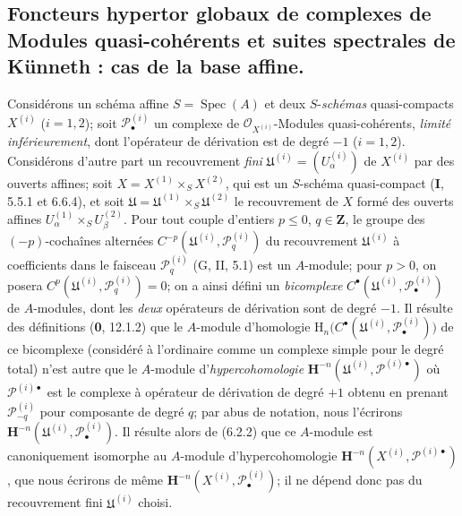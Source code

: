 \subsection{Foncteurs hypertor globaux de complexes de Modules quasi-cohérents
et suites spectrales de Künneth : cas de la base affine.}
\label{subsection:III.6.6.fr}

\begin{env}[6.6.1]
Considérons un schéma affine $S=\operatorname{Spec}(A)$ et deux $S$-\emph{schémas}
quasi-compacts $X^{(i)}$ ($i=1,2$); soit $\mathscr P_\bullet^{(i)}$ un complexe
de $\mathscr O_{X^{(i)}}$-Modules quasi-cohérents, \emph{limité inférieurement}, dont
l'opérateur de dérivation est de degré $-1$ ($i=1,2$). Considérons d'autre
part un recouvrement \emph{fini}
$\mathfrak U^{(i)}=(U_\alpha^{(i)})$ de $X^{(i)}$ par des ouverts affines;
soit
$X=X^{(1)}\times_S X^{(2)}$,
qui est un $S$-schéma quasi-compact (\textbf{I}, 5.5.1 et 6.6.4), et soit
$\mathfrak U=\mathfrak U^{(1)}\times_S\mathfrak U^{(2)}$ le recouvrement de
$X$ formé des ouverts affines
$U_\alpha^{(1)}\times_S U_\beta^{(2)}$. Pour tout couple d'entiers
$p\leqslant0$, $q\in\mathbf Z$, le groupe des $(-p)$-cochaînes alternées
$C^{-p}(\mathfrak U^{(i)},\mathscr P_q^{(i)})$
du recouvrement $\mathfrak U^{(i)}$ à coefficients dans le faisceau
$\mathscr P_q^{(i)}$ (G, II, 5.1) est un $A$-module; pour $p>0$, on posera
$C^p(\mathfrak U^{(i)},\mathscr P_q^{(i)})=0$; on a ainsi défini un
\emph{bicomplexe}
$C^\bullet(\mathfrak U^{(i)},\mathscr P_\bullet^{(i)})$
de $A$-modules, dont les \emph{deux} opérateurs de dérivation sont de degré $-1$. Il
résulte des définitions (\textbf{0}, 12.1.2) que le $A$-module
d'homologie
$\mathrm H_n\bigl(C^\bullet
(\mathfrak U^{(i)},\mathscr P_\bullet^{(i)})\bigr)$
de ce bicomplexe (considéré à l'ordinaire comme un complexe simple pour le
degré total) n'est autre que le $A$-module d'\emph{hypercohomologie}
$\mathbf H^{-n}
(\mathfrak U^{(i)},\mathscr P^{(i)\bullet})$
où $\mathscr P^{(i)\bullet}$ est le complexe à opérateur de dérivation de
degré $+1$ obtenu en prenant $\mathscr P_{-q}^{(i)}$ pour composante de degré
$q$; par abus de notation, nous l'écrirons
$\mathbf H^{-n}(\mathfrak U^{(i)},\mathscr P_\bullet^{(i)})$. Il résulte alors
de (6.2.2) que ce $A$-module est canoniquement isomorphe au $A$-module
d'hypercohomologie
$\mathbf H^{-n}(X^{(i)},\mathscr P^{(i)\bullet})$, que nous écrirons de même
$\mathbf H^{-n}(X^{(i)},\mathscr P_\bullet^{(i)})$; il ne dépend donc pas du
recouvrement fini $\mathfrak U^{(i)}$ choisi.
\end{env}

